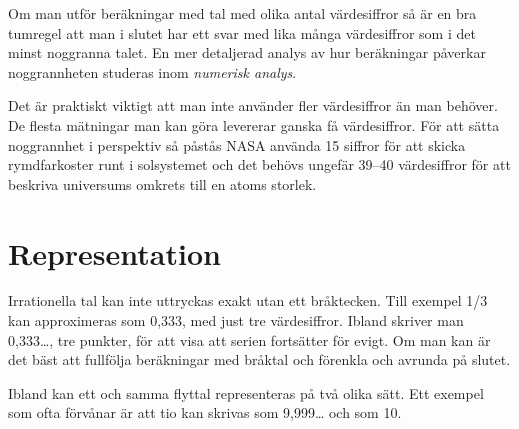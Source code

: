 Om man utför beräkningar med tal med olika antal värdesiffror så är en
bra tumregel att man i slutet har ett svar med lika många värdesiffror
som i det minst noggranna talet. En mer detaljerad analys av hur
beräkningar påverkar noggrannheten studeras inom \emph{numerisk
analys}.

Det är praktiskt viktigt att man inte använder fler värdesiffror än
man behöver.  De flesta mätningar man kan göra levererar ganska få
värdesiffror.  För att sätta noggrannhet i perspektiv så påstås NASA
använda 15 siffror för att skicka rymdfarkoster runt i solsystemet och
det behövs ungefär 39--40 värdesiffror för att beskriva universums
omkrets till en atoms storlek.

\section{Representation}

Irrationella tal kan inte uttryckas exakt utan ett bråktecken. Till
exempel 1/3 kan approximeras som 0,333, med just tre värdesiffror.
Ibland skriver man 0,333…, tre punkter, för att visa att serien
fortsätter för evigt. Om man kan är det bäst att fullfölja beräkningar
med bråktal och förenkla och avrunda på slutet.

Ibland kan ett och samma flyttal representeras på två olika sätt. Ett
exempel som ofta förvånar är att tio kan skrivas som 9,999… och som
10.







